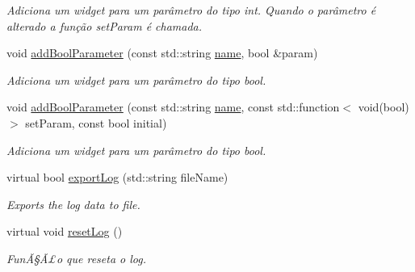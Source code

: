 \begin{DoxyCompactItemize}
\begin{DoxyCompactList}\small\item\em Adiciona um widget para um parâmetro do tipo int. Quando o parâmetro é alterado a função set\+Param é chamada. \end{DoxyCompactList}\item 
\hypertarget{class_process_control_a29d5382fa365a84b2fe460e876f4e283}{}void \hyperlink{class_process_control_a29d5382fa365a84b2fe460e876f4e283}{add\+Bool\+Parameter} (const std\+::string \hyperlink{class_process_control_abc29e461e01cc0c712944f8f47f91331}{name}, bool \&param)\label{class_process_control_a29d5382fa365a84b2fe460e876f4e283}

\begin{DoxyCompactList}\small\item\em Adiciona um widget para um parâmetro do tipo bool. \end{DoxyCompactList}\item 
\hypertarget{class_process_control_af29744bba8cc61999481a5d3849004ce}{}void \hyperlink{class_process_control_af29744bba8cc61999481a5d3849004ce}{add\+Bool\+Parameter} (const std\+::string \hyperlink{class_process_control_abc29e461e01cc0c712944f8f47f91331}{name}, const std\+::function$<$ void(bool)$>$ set\+Param, const bool initial)\label{class_process_control_af29744bba8cc61999481a5d3849004ce}

\begin{DoxyCompactList}\small\item\em Adiciona um widget para um parâmetro do tipo bool. \end{DoxyCompactList}\item 
\hypertarget{class_process_control_aad8b7703b6f7c1e90253faa8a79246bc}{}virtual bool \hyperlink{class_process_control_aad8b7703b6f7c1e90253faa8a79246bc}{export\+Log} (std\+::string file\+Name)\label{class_process_control_aad8b7703b6f7c1e90253faa8a79246bc}

\begin{DoxyCompactList}\small\item\em Exports the log data to file. \end{DoxyCompactList}\item 
\hypertarget{class_process_control_a0f269bca8139be827d8f673bed676f60}{}virtual void \hyperlink{class_process_control_a0f269bca8139be827d8f673bed676f60}{reset\+Log} ()\label{class_process_control_a0f269bca8139be827d8f673bed676f60}

\begin{DoxyCompactList}\small\item\em FunÃ§Ã£o que reseta o log. \end{DoxyCompactList}\end{DoxyCompactItemize}

